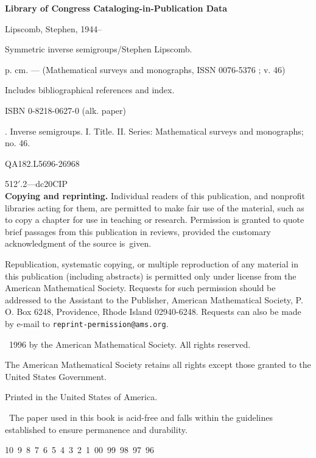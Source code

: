 \documentclass{surv-l}
\numberwithin{equation}{section}
\numberwithin{table}{section}
\numberwithin{figure}{section}
\theoremstyle{definition}
\newenvironment{copyrightpage}{\clearpage\thispagestyle{empty}}{\thispagestyle{empty}\clearpage}
\newcommand\circledinfty{\ooalign{$\bigcirc$\cr$\infty$\cr}\space}
\begin{document}
\begin{copyrightpage}
\textbf{Library of Congress Cataloging-in-Publication Data}

Lipscomb, Stephen, 1944--

\quad Symmetric inverse semigroups/Stephen Lipscomb.

\qquad p. cm. --- (Mathematical surveys and monographs, ISSN
0076-5376 ; v. 46)

\quad Includes bibliographical references and index.

\quad ISBN 0-8218-0627-0 (alk. paper)

. Inverse semigroups. I. Title. II. Series: Mathematical
surveys and monographs; no. 46.

QA182.L56\hfill 96-26968

512$'$.2---dc20\hfill CIP\\

\textbf{Copying and reprinting.} Individual readers of this
publication, and nonprofit libraries acting for them, are
permitted to make fair use of the material, such as to copy a
chapter for use in teaching or research. Permission is granted to
quote brief passages from this publication in reviews, provided
the customary acknowledgment of the source is~given.

Republication, systematic copying, or multiple reproduction of any
material in this publication (including abstracts) is permitted
only under license from the American Mathematical Society.
Requests for such permission should be addressed to the Assistant
to the Publisher, American Mathematical Society, P. O. Box 6248,
Providence, Rhode Island 02940-6248. Requests can also be made by
e-mail to \texttt{reprint-permission@ams.org}.

\begin{center}
\textcopyright\ 1996 by the American Mathematical Society. All rights reserved.

The American Mathematical Society retains all rights except those granted to the United States Government.

Printed in the United States of America.

\circledinfty\ The paper used in this book is acid-free and falls within the guidelines established to ensure permanence and durability.

10\ 9\ 8\ 7\ 6\ 5\ 4\ 3\ 2\ 1\ 00\ 99\ 98\ 97\ 96
\end{center}
\end{copyrightpage}


\tableofcontents
\end{document}
